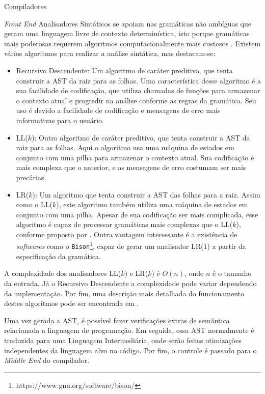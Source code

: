 \begin{section}{Compiladores}
\begin{subsection}{\textit{Front End}}
    Analisadores Sintáticos se apoiam nas gramáticas não ambíguas que geram uma
linguagem livre de contexto determinística, isto porque gramáticas mais
poderosas requerem algoritmos computacionalmente mais custosos
\citep{sipser2012}. Existem vários algoritmos para realizar a análise sintática,
mas destacam-se:
\begin{itemize}
	\item Recursivo Descendente: Um algoritmo de caráter preditivo, que tenta
	    construir a AST da raiz para as folhas. Uma característica desse algoritmo
		é a sua facilidade de codificação, que utiliza chamadas de funções para
		armazenar o contexto atual e progredir na análise conforme as regras da
		gramática. Seu uso é devido a facilidade de codificação e mensagens de
		erro mais informativas para o usuário.

    \item LL($k$): Outro algoritmo de caráter preditivo, que tenta construir a AST da
        raiz para as folhas. Aqui o algoritmo usa uma máquina de estados em conjunto
		com uma pilha para armazenar o contexto atual. Sua codificação é mais
		complexa que o anterior, e as mensagens de erro costumam ser mais precárias.

    \item LR($k$): Um algoritmo que tenta construir a AST das folhas para a raiz.
		  Assim como o LL($k$), este algoritmo também utiliza uma máquina de estados
		  em conjunto com uma pilha. Apesar de sua codificação ser mais complicada,
          esse algoritmo é capaz de processar gramáticas mais complexas que
          o LL($k$), conforme proposto por \cite{knuth1965translation}.
          Outra vantagem interessante é a existência de
          \textit{softwares} como o
          \texttt{Bison}\footnote{https://www.gnu.org/software/bison/}, capaz
          de gerar um analisador LR($1$) a partir da especificação da gramática.
\end{itemize}
	A complexidade dos analisadores LL($k$) e LR($k$) é $O(n)$, onde $n$ 
	é o tamanho da entrada. Já o Recursivo Descendente a complexidade pode variar
	dependendo da implementação.
    Por fim, uma descrição mais detalhada do funcionamento destes algoritmos
pode ser encontrada em \citep{appel2004modern}.

    Uma vez gerada a AST, é possível fazer verificações extras de semântica
relacionada a linguagem de programação. Em seguida, essa AST normalmente é
traduzida para uma Linguagem Intermediária, onde serão feitas otimizações
independentes da linguagem alvo no código. Por fim, o controle é passado
para o \textit{Middle End} do compilador.


\end{subsection}
\end{section}
